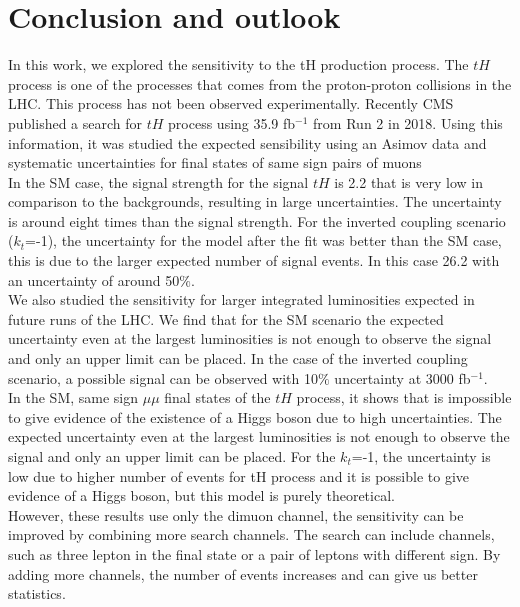 
\chapter{Conclusion and outlook}
In this work, we explored the sensitivity to the tH production process.
The $tH$ process is one of the processes that comes from the proton-proton collisions in the LHC. This process has not been observed experimentally. Recently CMS published a search for $tH$ process using 35.9 fb$^{-1}$ from Run 2 in 2018. Using this information, it was studied the expected sensibility using an Asimov data and systematic uncertainties for final states of same sign pairs of muons \\

In the SM case, the signal strength for the signal $tH$ is 2.2 that is very low in comparison to
the backgrounds, resulting in large uncertainties. The uncertainty is around eight times than the signal strength. 
For the inverted coupling scenario ($k_t$=-1), the uncertainty for the model after the fit was better than the
SM case, this is due to the larger expected number of signal events. In this case 26.2 with an uncertainty of around 50$\%$.
\\

We also studied the sensitivity for larger integrated luminosities expected in future runs of the LHC. We find that for the SM scenario the expected uncertainty even at the largest luminosities is not enough to observe the signal and only an upper limit can be placed. In the case of the inverted coupling scenario, a possible signal can be observed with 10$\%$ uncertainty at 3000 fb$^{-1}$.\\

In the SM, same sign $\mu\mu$ final states of the $tH$ process, it shows that is impossible to give evidence of the existence of a Higgs boson due to high uncertainties. The expected uncertainty even at the largest luminosities is not enough to observe the signal and only an upper limit can be placed. 
For the $k_t$=-1, the uncertainty is low due to higher number of events for tH process and it is possible to give evidence of a Higgs
boson, but this model is purely theoretical.\\

However, these results use only the dimuon channel, the sensitivity can be improved by combining more search channels. The search can include channels, such as three lepton in the final state or a pair of leptons with different sign. By adding more channels, the number of events increases and can give us better statistics. 

